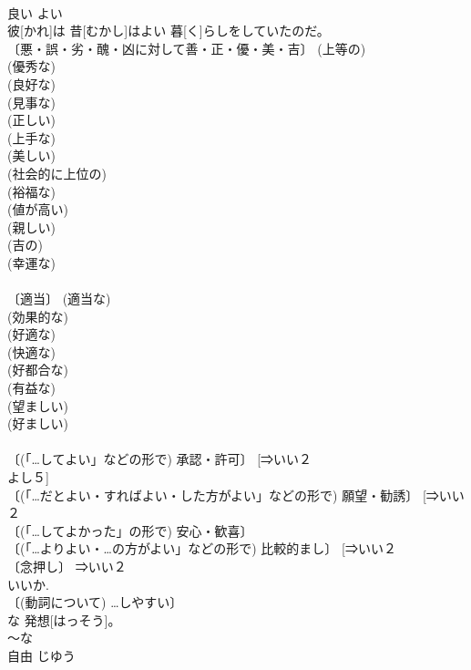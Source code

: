 \documentclass[8pt]{extreport}
\begin{document}
\begin{CJK}{UTF8}{min}
\\	良い	よい	
\\	彼[かれ]は 昔[むかし]はよい 暮[く]らしをしていたのだ。	
\\	〔悪・誤・劣・醜・凶に対して善・正・優・美・吉〕 (上等の) 
\\	(優秀な) 
\\	(良好な) 
\\	(見事な) 
\\	(正しい) 
\\	(上手な) 
\\	(美しい) 
\\	(社会的に上位の) 
\\	(裕福な) 
\\	(値が高い) 
\\	(親しい) 
\\	(吉の) 
\\	(幸運な) 
\\	[⇒いい２, よからぬ, よき, よかれ] 
\\	〔適当〕 (適当な) 
\\	(効果的な) 
\\	(好適な) 
\\	(快適な) 
\\	(好都合な) 
\\	(有益な) 
\\	(望ましい) 
\\	(好ましい) 
\\	[⇒いい２ 
\\	〔(「…でよい」 「よかったら」などの形で) 許容・満足〕 [⇒いい２ 
\\	よし５, よろしい] 
\\	〔(「…してよい」などの形で) 承認・許可〕 [⇒いい２ 
\\	よし５] 
\\	〔(「…だとよい・すればよい・した方がよい」などの形で) 願望・勧誘〕 [⇒いい２ 
\\	〔(「…してよかった」の形で) 安心・歓喜〕 
\\	〔(「…よりよい・…の方がよい」などの形で) 比較的まし〕 [⇒いい２ 
\\	〔念押し〕 ⇒いい２ 
\\	いいか. 
\\	〔(動詞について) …しやすい〕 
\\	[⇒いい２ 
\\	良い	いい	
\\	自由	じゆう	
\\	自由[じゆう]な 発想[はっそう]。	
\\	～な 
\\	自由	じゆう	

\end{CJK}
\end{document}
